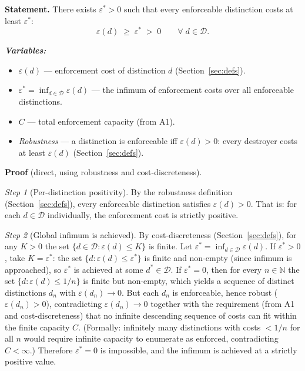 \documentclass[11pt]{article}
\newenvironment{varlist}{\begin{itemize}[nosep,leftmargin=2em]}{\end{itemize}}
\begin{document}
\begin{tcolorbox}[apfbox, title={Lemma $L_{\varepsilon^*}$ (Minimum Cost)}]
\textbf{Statement.}  There exists $\varepsilon^* > 0$ such that every enforceable distinction costs at least $\varepsilon^*$:
\begin{equation}
\varepsilon(d) \;\ge\; \varepsilon^* \;>\; 0 \qquad \forall\; d \in \mathcal{D}.
\end{equation}

\smallskip\noindent\textbf{\textit{Variables:}}
\begin{varlist}
\item $\varepsilon(d)$ --- enforcement cost of distinction $d$ (Section~\ref{sec:defs}).
\item $\varepsilon^* = \inf_{d \in \mathcal{D}} \varepsilon(d)$ --- the infimum of enforcement costs over all enforceable distinctions.
\item $C$ --- total enforcement capacity (from A1).
\item \textit{Robustness} --- a distinction is enforceable iff $\varepsilon(d) > 0$: every destroyer costs at least $\varepsilon(d)$ (Section~\ref{sec:defs}).
\end{varlist}

\smallskip\noindent\textbf{Proof} (direct, using robustness and cost-discreteness).

\textit{Step 1} (Per-distinction positivity).  By the robustness definition (Section~\ref{sec:defs}), every enforceable distinction satisfies $\varepsilon(d) > 0$.  That is: for each $d \in \mathcal{D}$ individually, the enforcement cost is strictly positive.

\textit{Step 2} (Global infimum is achieved).  By cost-discreteness (Section~\ref{sec:defs}), for any $K > 0$ the set $\{d \in \mathcal{D} : \varepsilon(d) \le K\}$ is finite.  Let $\varepsilon^* = \inf_{d \in \mathcal{D}} \varepsilon(d)$.  If $\varepsilon^* > 0$, take $K = \varepsilon^*$: the set $\{d : \varepsilon(d) \le \varepsilon^*\}$ is finite and non-empty (since infimum is approached), so $\varepsilon^*$ is achieved at some $d^* \in \mathcal{D}$.  If $\varepsilon^* = 0$, then for every $n \in \mathbb{N}$ the set $\{d : \varepsilon(d) \le 1/n\}$ is finite but non-empty, which yields a sequence of distinct distinctions $d_n$ with $\varepsilon(d_n) \to 0$.  But each $d_n$ is enforceable, hence robust ($\varepsilon(d_n) > 0$), contradicting $\varepsilon(d_n) \to 0$ together with the requirement (from A1 and cost-discreteness) that no infinite descending sequence of costs can fit within the finite capacity $C$.  (Formally: infinitely many distinctions with costs $< 1/n$ for all $n$ would require infinite capacity to enumerate as enforced, contradicting $C < \infty$.)  Therefore $\varepsilon^* = 0$ is impossible, and the infimum is achieved at a strictly positive value.


\end{tcolorbox}
\end{document}
